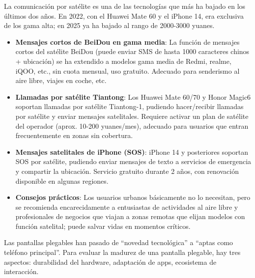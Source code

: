 
La comunicación por satélite es una de las tecnologías que más ha bajado en los últimos dos años. En 2022, con el Huawei Mate 60 y el iPhone 14, era exclusiva de los gama alta; en 2025 ya ha bajado al rango de 2000-3000 yuanes.

\begin{itemize}
  \item \textbf{Mensajes cortos de BeiDou en gama media}: La función de mensajes cortos del satélite BeiDou (puede enviar SMS de hasta 1000 caracteres chinos + ubicación) se ha extendido a modelos gama media de Redmi, realme, iQOO, etc., sin cuota mensual, uso gratuito. Adecuado para senderismo al aire libre, viajes en coche, etc.
  \item \textbf{Llamadas por satélite Tiantong}: Los Huawei Mate 60/70 y Honor Magic6 soportan llamadas por satélite Tiantong-1, pudiendo hacer/recibir llamadas por satélite y enviar mensajes satelitales. Requiere activar un plan de satélite del operador (aprox. 10-200 yuanes/mes), adecuado para usuarios que entran frecuentemente en zonas sin cobertura.
  \item \textbf{Mensajes satelitales de iPhone (SOS)}: iPhone 14 y posteriores soportan SOS por satélite, pudiendo enviar mensajes de texto a servicios de emergencia y compartir la ubicación. Servicio gratuito durante 2 años, con renovación disponible en algunas regiones.
  \item \textbf{Consejos prácticos}: Los usuarios urbanos básicamente no lo necesitan, pero se recomienda encarecidamente a entusiastas de actividades al aire libre y profesionales de negocios que viajan a zonas remotas que elijan modelos con función satelital; puede salvar vidas en momentos críticos.
\end{itemize}


Las pantallas plegables han pasado de “novedad tecnológica” a “aptas como teléfono principal”. Para evaluar la madurez de una pantalla plegable, hay tres aspectos: durabilidad del hardware, adaptación de apps, ecosistema de interacción.

